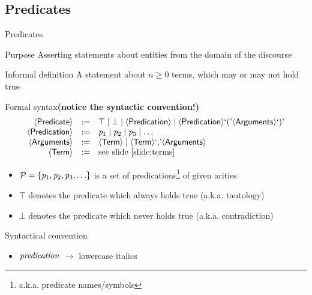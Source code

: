 \documentclass[presentation]{beamer}\mode<presentation>{\usetheme{AMSBolognaFC}}
\begin{document}
\subsection{Predicates}

\begin{frame}[allowframebreaks]{Predicates}
    \begin{block}{Purpose}\centering
        Asserting statements about entities from the \alert{domain of the discourse}
    \end{block}
    \begin{block}{Informal definition}
        A \alert{statement} about $n\geq 0$ \alert{terms}, which may or may not hold true
    \end{block}
    \begin{alertblock}{Formal syntax\hfill\textbf{\footnotesize(notice the syntactic convention!)}}
        $$\begin{array}{rcl}
            \mathsf{\left\langle Predicate\right\rangle} & := & \top \mid \bot \mid \mathsf{\left\langle Predication\right\rangle} \mid \mathsf{\left\langle Predication\right\rangle} \text{`}\mathit{(}\text{'} \mathsf{\left\langle Arguments\right\rangle} \text{`}\mathit{)}\text{'}
            \\
            \mathsf{\left\langle Predication\right\rangle} & := & \mathit{p}_1 \mid \mathit{p}_2 \mid \mathit{p}_3 \mid \ldots
            \\
            \mathsf{\left\langle Arguments\right\rangle} & := & \mathsf{\left\langle Term\right\rangle} \mid \mathsf{\left\langle Term\right\rangle} \text{`}\mathit{,}\text{'} \mathsf{\left\langle Arguments\right\rangle}
            \\
            \mathsf{\left\langle Term\right\rangle} & := & \text{see slide \ref{slide:terms}}
        \end{array}$$
        \begin{itemize}
            \item $\mathcal{P} = \{ \mathit{p}_1, \mathit{p}_2, \mathit{p}_3, \ldots \}$ is a set of \alert{predications}\footnote{a.k.a. predicate names/symbols} of given \alert{arities}
            \item \alert{$\top$} denotes the predicate which \alert{always} holds true (a.k.a. \alert{tautology})
            \item \alert{$\bot$} denotes the predicate which \alert{never} holds true (a.k.a. \alert{contradiction})
        \end{itemize}
    \end{alertblock}
    \begin{block}{Syntactical convention}
        \begin{itemize}
            \item $\mathit{predication}$ $\rightarrow$ lowercase italics
        \end{itemize}
    \end{block}
\end{frame}
\end{document}
